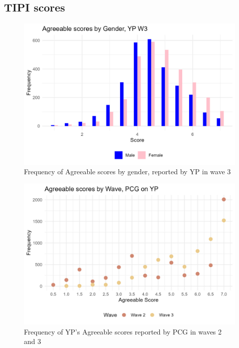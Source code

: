 \documentclass[a4paper]{article}
\begin{document}
\clearpage
\subsection{TIPI scores}
\begin{figure}[htbp] 
    \centering
    \includegraphics[width=1\linewidth]{Frequency of Agreeable by Gender.jpeg}
    \caption{Frequency of Agreeable scores by gender, reported by YP in wave 3}
    \label{}
\end{figure}

\begin{figure}[htbp] 
    \centering
    \includegraphics[width=1\linewidth]{Frequency of Agreeable by Wave, PCG.jpeg}
    \caption{Frequency of YP's Agreeable scores reported by PCG in waves 2 and 3}
    \label{}
\end{figure}
\end{document}
